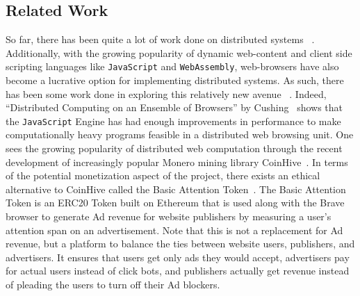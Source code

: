 \documentclass[runningheads]{llncs}
\newcommand{\trishita}[1]{}%
\begin{document}
\subsection{Related Work}
So far, there has been quite a lot of work done on distributed systems ~\cite{scheduling,parallel,orca}. Additionally, with the growing popularity of dynamic web-content and client side scripting languages like \verb|JavaScript| and \verb|WebAssembly|, web-browsers have also become a lucrative option for implementing distributed systems. As such, there has been some work done in exploring this relatively new avenue ~\cite{WebFlow,Duda}. 
Indeed, ``Distributed Computing on an Ensemble of Browsers'' by Cushing~\cite{Cushing} shows that the \verb|JavaScript| Engine has had enough improvements in performance to make computationally heavy programs feasible in a distributed web browsing unit. 
One sees the growing popularity of distributed web computation through the recent development of increasingly popular Monero mining library CoinHive~\cite{coinhive}. In terms of the potential monetization aspect of the project, there exists an ethical alternative to CoinHive called the Basic Attention Token~\trishita{Need to cite}. The Basic Attention Token is an ERC20 Token built on Ethereum that is used along with the Brave browser to generate Ad revenue for website publishers by measuring a user's attention span on an advertisement. Note that this is not a replacement for Ad revenue, but a platform to balance the ties between website users, publishers, and advertisers. It ensures that users get only ads they would accept, advertisers pay for actual users instead of click bots, and publishers actually get revenue instead of pleading the users to turn off their Ad blockers.
\end{document}
